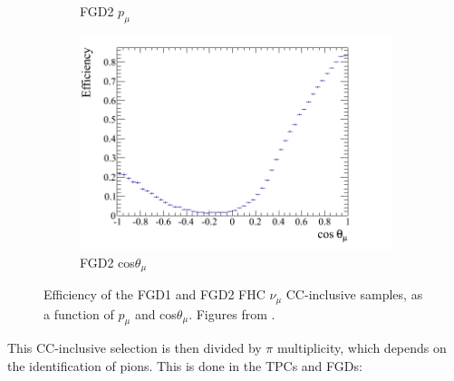 \begin{figure}
\begin{subfigure}{.49\textwidth}
  \caption{FGD2 $p_{\mu}$}
\end{subfigure}
\begin{subfigure}{.49\textwidth}
  \centering
  \includegraphics[width=1.0\linewidth]{figs/effcosfgd2numu}
  \caption{FGD2 cos$\theta_{\mu}$}
\end{subfigure}
\caption{Efficiency of the FGD1 and FGD2 FHC $\nu_{\mu}$ CC-inclusive samples, as a function of $p_{\mu}$ and cos$\theta_{\mu}$. Figures from \cite{tn212}.}
\label{fig:numueff}
\end{figure}

This CC-inclusive selection is then divided by $\pi$ multiplicity, which depends on the identification of pions. This is done in the TPCs and FGDs:

